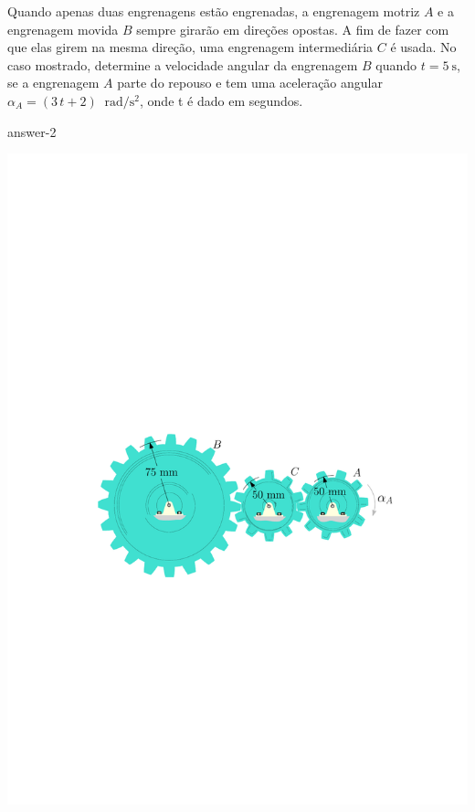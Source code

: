 \item Quando apenas duas engrenagens estão engrenadas, a engrenagem motriz $A$ e a engrenagem movida $B$ sempre girarão em direções opostas. A fim de fazer com que elas girem na mesma direção, uma engrenagem intermediária $C$ é usada. No caso mostrado, determine a velocidade angular da engrenagem $B$ quando $t=\SI{5}{\second}$, se a engrenagem $A$ parte do repouso e tem uma aceleração angular $\alpha_{A} =(3\,t+2)$ $\SI{}{\radian/\second^{2}}$, onde t é dado em segundos.

{answer-2}

\begin{flushleft}
	\includegraphics[scale=.85]{images/draw_2}
\end{flushleft}